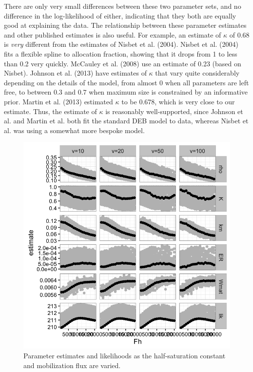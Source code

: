 \documentclass[12pt,reqno,final,pdftex]{amsart}\usepackage[]{graphicx}\usepackage[]{color}
\newenvironment{knitrout}{}{} %
\theoremstyle{plain}
\numberwithin{equation}{part}
\begin{document}
There are only very small differences between these two parameter sets, and no difference in the log-likelihood of either, indicating that they both are equally good at explaining the data.
The relationship between these parameter estimates and other published estimates is also useful.
For example, an estimate of $\kappa$ of 0.68 is \emph{very} different from the estimates of Nisbet et al. (2004).
Nisbet et al. (2004) fits a flexible spline to allocation fraction, showing that it drops from 1 to less than 0.2 very quickly.
McCauley et al. (2008) use an estimate of 0.23 (based on Nisbet).
Johnson et al. (2013) have estimates of $\kappa$ that vary quite considerably depending on the details of the model, from almost 0 when all parameters are left free, to between 0.3 and 0.7 when maximum size is constrained by an informative prior.
Martin et al. (2013) estimated $\kappa$ to be 0.678, which is very close to our estimate.
Thus, the estimate of $\kappa$ is reasonably well-supported, since Johnson et al. and Martin et al. both fit the standard DEB model to data, whereas Nisbet et al. was using a somewhat more bespoke model.

\begin{knitrout}\scriptsize
{}\color{fgcolor}\begin{figure}

\includegraphics[width=\linewidth]{figure/Fh-profile-1} \hfill{}

\caption[Parameter estimates and likelihoods as the half-saturation constant and mobilization flux are varied]{Parameter estimates and likelihoods as the half-saturation constant and mobilization flux are varied.}\label{fig:Fh-profile}
\end{figure}


\end{knitrout}
\end{document}
